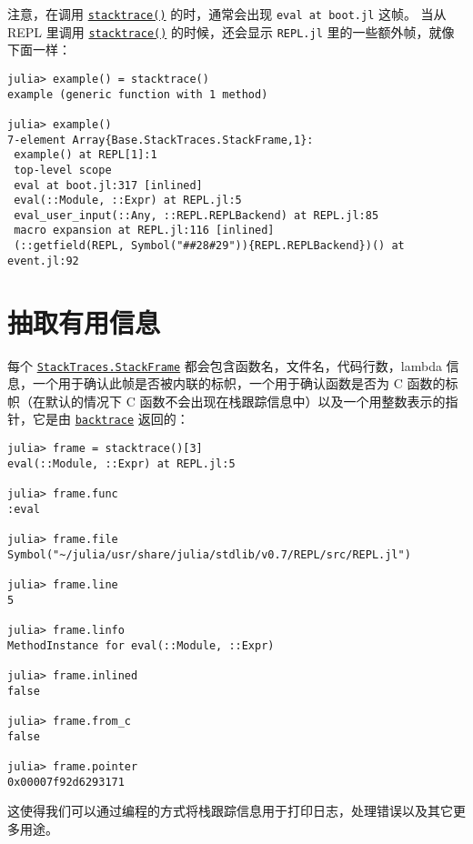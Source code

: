注意，在调用 \hyperlink{11964270650763140298}{\texttt{stacktrace()}} 的时，通常会出现 \texttt{eval at boot.jl} 这帧。 当从 REPL 里调用 \hyperlink{11964270650763140298}{\texttt{stacktrace()}} 的时候，还会显示 \texttt{REPL.jl} 里的一些额外帧，就像下面一样：




\begin{verbatim}
julia> example() = stacktrace()
example (generic function with 1 method)

julia> example()
7-element Array{Base.StackTraces.StackFrame,1}:
 example() at REPL[1]:1
 top-level scope
 eval at boot.jl:317 [inlined]
 eval(::Module, ::Expr) at REPL.jl:5
 eval_user_input(::Any, ::REPL.REPLBackend) at REPL.jl:85
 macro expansion at REPL.jl:116 [inlined]
 (::getfield(REPL, Symbol("##28#29")){REPL.REPLBackend})() at event.jl:92
\end{verbatim}



\hypertarget{17184729199221037868}{}


\section{抽取有用信息}



每个 \hyperlink{16824886840215699957}{\texttt{StackTraces.StackFrame}} 都会包含函数名，文件名，代码行数，lambda 信息，一个用于确认此帧是否被内联的标帜，一个用于确认函数是否为 C 函数的标帜（在默认的情况下 C 函数不会出现在栈跟踪信息中）以及一个用整数表示的指针，它是由 \hyperlink{6187626674327343338}{\texttt{backtrace}} 返回的：




\begin{verbatim}
julia> frame = stacktrace()[3]
eval(::Module, ::Expr) at REPL.jl:5

julia> frame.func
:eval

julia> frame.file
Symbol("~/julia/usr/share/julia/stdlib/v0.7/REPL/src/REPL.jl")

julia> frame.line
5

julia> frame.linfo
MethodInstance for eval(::Module, ::Expr)

julia> frame.inlined
false

julia> frame.from_c
false

julia> frame.pointer
0x00007f92d6293171
\end{verbatim}



这使得我们可以通过编程的方式将栈跟踪信息用于打印日志，处理错误以及其它更多用途。



